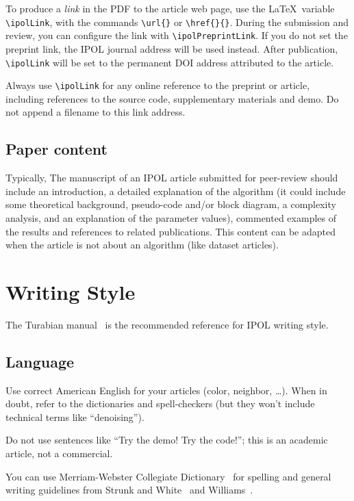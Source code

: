 \documentclass{ipol}
\begin{document}
To produce a \emph{link} in the PDF to the article web page, use the
\LaTeX\ variable \verb|\ipolLink|, with the commands \verb|\url{}| or
\verb|\href{}{}|. During the submission and review, you can configure
the link with \verb|\ipolPreprintLink|. If you do not set the preprint
link, the IPOL journal address will be used instead. After publication,
\verb|\ipolLink| will be set to the permanent DOI address attributed
to the article.

Always use \verb|\ipolLink| for any online reference to the preprint
or article, including references to the source code, supplementary
materials and demo. Do not append a filename to this link address.

\subsection{Paper content}

Typically, The manuscript of an IPOL article submitted for peer-review should
include an introduction, a detailed explanation of the algorithm (it could
include some theoretical background, pseudo-code and/or block diagram, a
complexity analysis, and an explanation of the parameter values), commented
examples of the results and references to related publications. This content
can be adapted when the article is not about an algorithm (like dataset
articles).


\section{Writing Style}

The Turabian manual~\cite{turabian} is the recommended reference for
IPOL writing style.

\subsection{Language}

Use correct American English for your articles (color, neighbor,
\ldots{}). When in doubt, refer to the dictionaries and spell-checkers
(but they won't include technical terms like ``denoising'').

Do not use sentences like ``Try the demo! Try the code!''; this
is an academic article, not a commercial.

You can use Merriam-Webster Collegiate
Dictionary~\cite{merriam-webster} for spelling and general writing
guidelines from Strunk and White~\cite{strunk-white} and
Williams~\cite{williams}.
\end{document}
